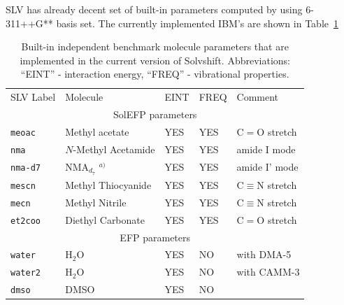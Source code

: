 \documentclass[a4paper,titlepage,twoside,fleqn,12pt]{book}
\begin{document}
\begin{refsection}
SLV has already decent set of built-in parameters computed 
by using 6-311++G** basis set. The currently implemented IBM's
are shown in Table~\ref{t:slv-ibm-buitin}
%
\begin{table}[t!]
\caption{
Built-in independent benchmark molecule parameters that are implemented
in the current version of {\sc Solvshift}. Abbreviations: ``EINT'' - interaction
energy, ``FREQ'' - vibrational properties.
\label{t:slv-ibm-buitin}}
\begin{tabular*}{1.0\textwidth}{@{\extracolsep{\fill} } lllll}
\hline\hline
 SLV Label             & Molecule                        & EINT &   FREQ   &     Comment                              \\
\multicolumn{5}{c}{SolEFP parameters} \\                                                           
\hline                                                                      
 \tt{meoac           } & Methyl acetate                  & YES  &   YES    &     C$=$O stretch                        \\ 
 \tt{nma             } & $N$-Methyl Acetamide            & YES  &   YES    &     amide I mode                         \\
 \tt{nma-d7          } & NMA$_{d_7}$ $^{a)}$             & YES  &   YES    &     amide I' mode                        \\
 \tt{mescn           } & Methyl Thiocyanide              & YES  &   YES    &     C$\equiv$N stretch                   \\
 \tt{mecn            } & Methyl Nitrile                  & YES  &   YES    &     C$\equiv$N stretch                   \\
 \tt{et2coo          } & Diethyl Carbonate               & YES  &   YES    &     C$=$O stretch                        \\
\multicolumn{5}{c}{EFP parameters} \\                                                                                   
\hline                                                                                                                  
 \tt{water           } & H$_2$O                          & YES  &   NO     &     with DMA-5                           \\
 \tt{water2          } & H$_2$O                          & YES  &   NO     &     with CAMM-3                          \\
 \tt{dmso            } & DMSO                            & YES  &   NO     &                                          \\

\end{tabular*}
\end{table}
\end{refsection}
\end{document}

